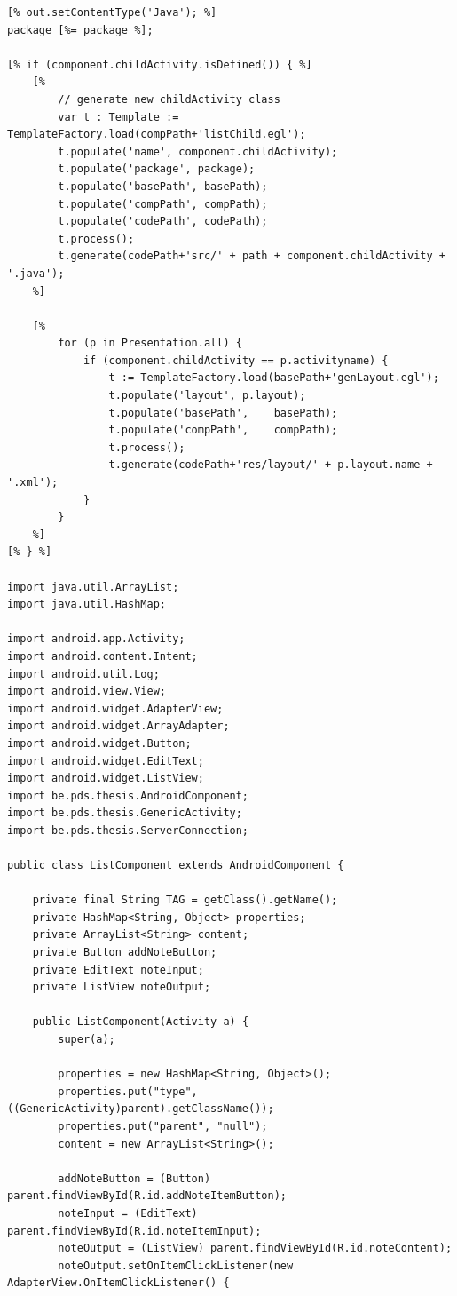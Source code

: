 \begin{lstlisting}[label=codegen-list,caption=Android List Component code-generation, captionpos=t]
[% out.setContentType('Java'); %]
package [%= package %];

[% if (component.childActivity.isDefined()) { %]
	[%
		// generate new childActivity class
		var t : Template := TemplateFactory.load(compPath+'listChild.egl');
		t.populate('name', component.childActivity);
		t.populate('package', package);
		t.populate('basePath', basePath);
		t.populate('compPath', compPath);
		t.populate('codePath', codePath);
		t.process();
		t.generate(codePath+'src/' + path + component.childActivity + '.java');
	%]

	[%
		for (p in Presentation.all) {
			if (component.childActivity == p.activityname) {
				t := TemplateFactory.load(basePath+'genLayout.egl');
				t.populate('layout', p.layout);
				t.populate('basePath',    basePath);
				t.populate('compPath',    compPath);
				t.process();
				t.generate(codePath+'res/layout/' + p.layout.name + '.xml');
			}
		}
	%]
[% } %]

import java.util.ArrayList;
import java.util.HashMap;

import android.app.Activity;
import android.content.Intent;
import android.util.Log;
import android.view.View;
import android.widget.AdapterView;
import android.widget.ArrayAdapter;
import android.widget.Button;
import android.widget.EditText;
import android.widget.ListView;
import be.pds.thesis.AndroidComponent;
import be.pds.thesis.GenericActivity;
import be.pds.thesis.ServerConnection;

public class ListComponent extends AndroidComponent {

	private final String TAG = getClass().getName();
	private HashMap<String, Object> properties;
	private ArrayList<String> content;
	private Button addNoteButton;
	private EditText noteInput;
	private ListView noteOutput;

	public ListComponent(Activity a) {
		super(a);

		properties = new HashMap<String, Object>();
		properties.put("type", ((GenericActivity)parent).getClassName());
		properties.put("parent", "null");
		content = new ArrayList<String>();
		
		addNoteButton = (Button) parent.findViewById(R.id.addNoteItemButton);
		noteInput = (EditText) parent.findViewById(R.id.noteItemInput);
		noteOutput = (ListView) parent.findViewById(R.id.noteContent);
		noteOutput.setOnItemClickListener(new AdapterView.OnItemClickListener() {


\end{lstlisting}
